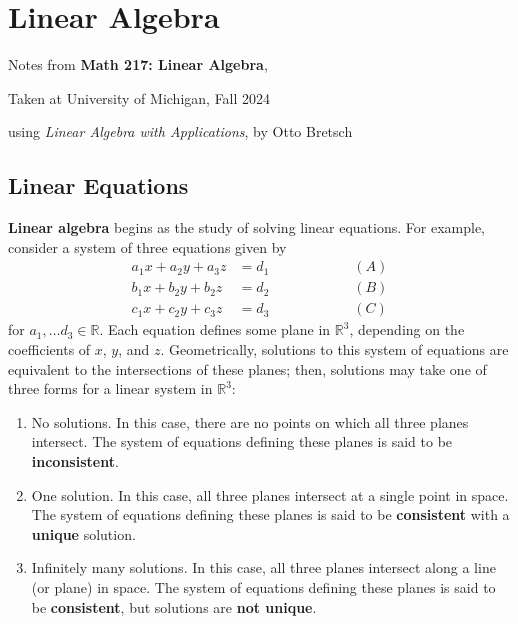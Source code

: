 \section{Linear Algebra}

\begin{center}
    Notes from \textbf{Math 217: Linear Algebra}, 
    
    Taken at University of Michigan, Fall 2024
    
    using \textit{Linear Algebra with Applications}, by Otto Bretsch
\end{center}

\subsection{Linear Equations}

\textbf{Linear algebra} begins as the study of solving linear equations. For example, consider a system of three equations given by
\begin{align*}
    a_1x + a_2y + a_3z &= d_1 \hspace{1in} (A)\\
    b_1x + b_2y + b_2z &= d_2 \hspace{1in} (B)\\
    c_1x + c_2y + c_3z &= d_3 \hspace{1in} (C)
\end{align*}
for $a_1,\dots d_3\in\mathbb{R}$. Each equation defines some plane in $\mathbb{R}^3$, depending on the coefficients of $x$, $y$, and $z$. Geometrically, solutions to this system of equations are equivalent to the intersections of these planes; then, solutions may take one of three forms for a linear system in $\mathbb{R}^3$:

\begin{enumerate}
    \item No solutions. In this case, there are no points on which all three planes intersect. The system of equations defining these planes is said to be \textbf{inconsistent}.
    \item One solution. In this case, all three planes intersect at a single point in space. The system of equations defining these planes is said to be \textbf{consistent} with a \textbf{unique} solution.
    \item Infinitely many solutions. In this case, all three planes intersect along a line (or plane) in space. The system of equations defining these planes is said to be \textbf{consistent}, but solutions are \textbf{not unique}.
\end{enumerate}

